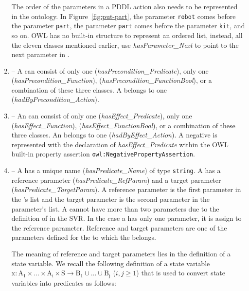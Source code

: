 \begin{enumerate}
    The order of the parameters in a PDDL action also needs to be represented in the ontology. In Figure~\ref{fig:put-part}, the parameter \texttt{robot} comes before the parameter \texttt{part}, the parameter \texttt{part} comes before the parameter \texttt{kit}, and so on. OWL has no built-in structure to represent an ordered list, instead, all the eleven classes mentioned earlier, use \emph{hasParameter\_Next} to point to the next parameter in .
\item {} -- A  can consist of only one  (\emph{hasPrecondition\_Predicate}), only one  (\emph{hasPrecondition\_Function}),  (\emph{hasPrecondition\_FunctionBool}), or a combination of these three classes. A  belongs to one  (\emph{hadByPrecondition\_Action}).
\item {} -- An  can consist of only one  (\emph{hasEffect\_Predicate}), only one  (\emph{hasEffect\_Function}),  (\emph{hasEffect\_FunctionBool}), or a combination of these three classes. An  belongs to one  (\emph{hadByEffect\_Action}). A negative  is represented with the declaration of \emph{hasEffect\_Predicate} within the OWL built-in property assertion \texttt{owl:NegativePropertyAssertion}.
\item {} -- A  has a unique name (\emph{hasPredicate\_Name}) of type \texttt{string}. A  has a reference parameter (\emph{hasPredicate\_RefParam}) and a target parameter (\emph{hasPredicate\_TargetParam}). A reference parameter is the first parameter in the 's list and the target parameter is the second parameter in the parameter's list. A  cannot have more than two parameters due to the definition of  in the SVR. In the case a  has only one parameter, it is assign to the reference parameter. Reference and target parameters are one of the parameters defined for the  to which the  belongs.
    
    The meaning of reference and target parameters lies in the definition of a state variable. We recall the following definition of a state variable $\mathrm{x: A_1\times \dots\times A_i\times S\rightarrow B_1\cup\dots\cup B_j}$ ($i, j\geq 1$) that is used to convert state variables into predicates as follows:


\end{enumerate}
